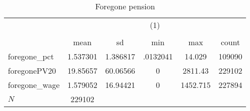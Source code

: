 \begin{table}[htbp]\centering
\def\sym#1{\ifmmode^{#1}\else\(^{#1}\)\fi}
\caption{Foregone pension}
\begin{tabular}{l*{1}{ccccc}}
\hline\hline
            &\multicolumn{5}{c}{(1)}                                         \\
            &\multicolumn{5}{c}{}                                            \\
            &        mean&          sd&         min&         max&       count\\
\hline
foregone\_pct&    1.537301&    1.386817&    .0132041&      14.029&      109090\\
foregonePV20&    19.85657&    60.06566&           0&     2811.43&      229102\\
foregone\_wage&    1.579052&    16.94421&           0&    1452.715&      227894\\
\hline
\(N\)       &      229102&            &            &            &            \\
\hline\hline
\end{tabular}
\end{table}
